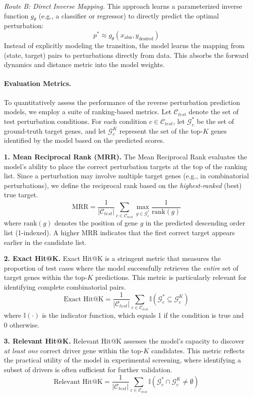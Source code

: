 \documentclass{article}
\begin{document}
\textit{Route B: Direct Inverse Mapping.}
This approach learns a parameterized inverse function $g_\theta$ (e.g., a classifier or regressor) to directly predict the optimal perturbation:
\[
p^* \approx g_\theta(x_{\text{abn}}, y_{\text{desired}})
\]
Instead of explicitly modeling the transition, the model learns the mapping from (state, target) pairs to perturbations directly from data. This absorbs the forward dynamics and distance metric into the model weights.

\paragraph{Evaluation Metrics.}
To quantitatively assess the performance of the reverse perturbation prediction models, we employ a suite of ranking-based metrics. Let $\mathcal{C}_{test}$ denote the set of test perturbation conditions. For each condition $c \in \mathcal{C}_{test}$, let $\mathcal{G}_c^*$ be the set of ground-truth target genes, and let $\mathcal{G}_c^K$ represent the set of the top-$K$ genes identified by the model based on the predicted scores.

\textbf{1. Mean Reciprocal Rank (MRR).} The Mean Reciprocal Rank evaluates the model's ability to place the correct perturbation targets at the top of the ranking list. Since a perturbation may involve multiple target genes (e.g., in combinatorial perturbations), we define the reciprocal rank based on the \textit{highest-ranked} (best) true target.
\[
\text{MRR} = \frac{1}{|\mathcal{C}_{test}|} \sum_{c \in \mathcal{C}_{test}} \max_{g \in \mathcal{G}_c^*} \frac{1}{\text{rank}(g)}
\]
where $\text{rank}(g)$ denotes the position of gene $g$ in the predicted descending order list (1-indexed). A higher MRR indicates that the first correct target appears earlier in the candidate list.

\textbf{2. Exact Hit@K.} Exact Hit@K is a stringent metric that measures the proportion of test cases where the model successfully retrieves the \textit{entire} set of target genes within the top-$K$ predictions. This metric is particularly relevant for identifying complete combinatorial pairs.
\[
\text{Exact Hit@K} = \frac{1}{|\mathcal{C}_{test}|} \sum_{c \in \mathcal{C}_{test}} \mathbb{I}(\mathcal{G}_c^* \subseteq \mathcal{G}_c^K)
\]
where $\mathbb{I}(\cdot)$ is the indicator function, which equals 1 if the condition is true and 0 otherwise.

\textbf{3. Relevant Hit@K.} Relevant Hit@K assesses the model's capacity to discover \textit{at least one} correct driver gene within the top-$K$ candidates. This metric reflects the practical utility of the model in experimental screening, where identifying a subset of drivers is often sufficient for further validation.
\[
\text{Relevant Hit@K} = \frac{1}{|\mathcal{C}_{test}|} \sum_{c \in \mathcal{C}_{test}} \mathbb{I}(\mathcal{G}_c^* \cap \mathcal{G}_c^K \neq \emptyset)
\]
\end{document}
